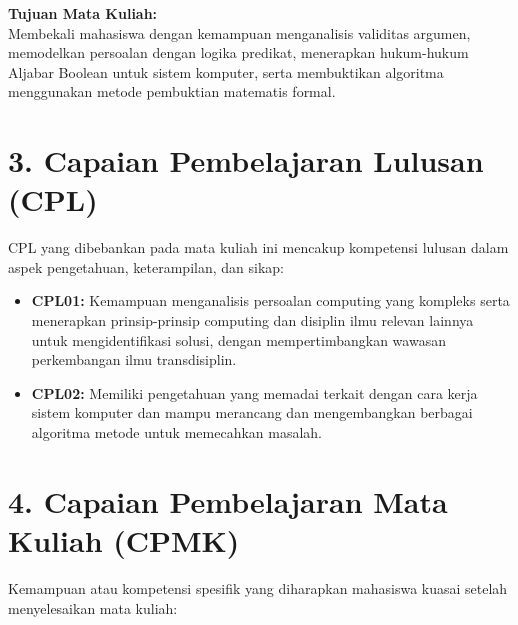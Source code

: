 \documentclass[12pt,a4paper]{article}
\begin{document}
\textbf{Tujuan Mata Kuliah:}\\
Membekali mahasiswa dengan kemampuan menganalisis validitas argumen, memodelkan persoalan dengan logika predikat, menerapkan hukum-hukum Aljabar Boolean untuk sistem komputer, serta membuktikan algoritma menggunakan metode pembuktian matematis formal.

\vspace{0.5cm}

\section*{3. Capaian Pembelajaran Lulusan (CPL)}

CPL yang dibebankan pada mata kuliah ini mencakup kompetensi lulusan dalam aspek pengetahuan, keterampilan, dan sikap:

\begin{itemize}[leftmargin=*]
  \item \textbf{CPL01:} Kemampuan menganalisis persoalan computing yang kompleks serta menerapkan prinsip-prinsip computing dan disiplin ilmu relevan lainnya untuk mengidentifikasi solusi, dengan mempertimbangkan wawasan perkembangan ilmu transdisiplin.
  
  \item \textbf{CPL02:} Memiliki pengetahuan yang memadai terkait dengan cara kerja sistem komputer dan mampu merancang dan mengembangkan berbagai algoritma metode untuk memecahkan masalah.
\end{itemize}

\vspace{0.5cm}

\section*{4. Capaian Pembelajaran Mata Kuliah (CPMK)}

Kemampuan atau kompetensi spesifik yang diharapkan mahasiswa kuasai setelah menyelesaikan mata kuliah:
\end{document}
